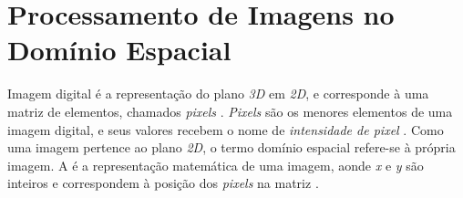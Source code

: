 %




\section{Processamento de Imagens no Domínio Espacial}

\par Imagem digital é a representação do plano \textit{3D} em \textit{2D}, e corresponde à uma matriz de elementos, chamados \textit{pixels} \cite{gonsalez2006}. \textit{Pixels} são os menores elementos de uma imagem digital, e seus valores recebem o nome de \textit{intensidade de pixel} \cite{gonsalez2006}. Como uma imagem pertence ao plano \textit{2D}, o termo domínio espacial refere-se à própria imagem. A  é a representação matemática de uma imagem, aonde \textit{x} e \textit{y} são inteiros e correspondem à posição dos \textit{pixels} na matriz \cite{gonsalez2006}.

